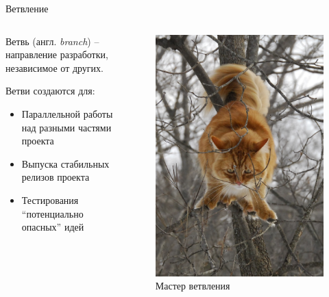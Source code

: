 \documentclass[presentation]{beamer}
\begin{document}
\begin{frame}{Ветвление}
  \begin{columns}
    \begin{column}{0.5\textwidth}
      \raisebox{-.30em}{\Large\HandRight}\hspace{.25em} Ветвь
      (англ. \emph{branch}) -- направление разработки, независимое от
      других. \newline

      Ветви создаются для:
      \begin{itemize}
        \item Параллельной работы над разными частями проекта
        \item Выпуска стабильных релизов проекта
        \item Тестирования ``потенциально опасных'' идей
      \end{itemize}
    \end{column}
    \begin{column}{0.5\textwidth}
      \begin{figure}[htb]
        \centering
        \includegraphics[width=.9\textwidth]{cat-on-branches}
        \newline Мастер ветвления
      \end{figure}
    \end{column}
  \end{columns}
\end{frame}
\end{document}

